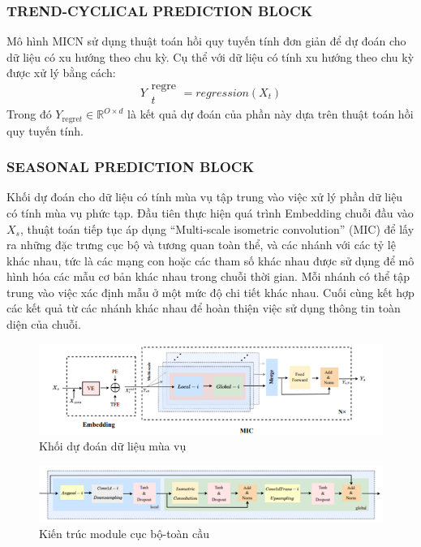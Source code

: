 \documentclass[conference]{IEEEtran}
\begin{document}
\subsubsection{TREND-CYCLICAL PREDICTION BLOCK}
Mô hình MICN sử dụng thuật toán hồi quy tuyến tính đơn giản để dự đoán cho dữ liệu có xu hướng theo chu kỳ. Cụ thể với dữ liệu có tính xu hướng theo chu kỳ được xử lý bằng cách:
\[Y{\substack{\text{regre}\\t}}{} = regression(X_t)\]
Trong đó \(Y_{\text{regre}t} \in \mathbb{R}^{O \times d}\) là kết quả dự đoán của phần này dựa trên thuật toán hồi quy tuyến tính.

\subsubsection{SEASONAL PREDICTION BLOCK}
Khối dự đoán cho dữ liệu có tính mùa vụ tập trung vào việc xử lý phần dữ liệu có tính mùa vụ phức tạp. Đầu tiên thực hiện quá trình Embedding chuỗi đầu vào $X_s$, thuật toán tiếp tục áp dụng “Multi-scale isometric convolution” (MIC) để lấy ra những đặc trưng cục bộ và tương quan toàn thể, và các nhánh với các tỷ lệ khác nhau, tức là các mạng con hoặc các tham số khác nhau được sử dụng để mô hình hóa các mẫu cơ bản khác nhau trong chuỗi thời gian. Mỗi nhánh có thể tập trung vào việc xác định mẫu ở một mức độ chi tiết khác nhau. Cuối cùng kết hợp các kết quả từ các nhánh khác nhau để hoàn thiện việc sử dụng thông tin toàn diện của chuỗi.
\begin{figure}[H]
    \centering
    \begin{minipage}{0.8\linewidth}
    \centering
        \includegraphics[width=\linewidth]{images/MICN_SeasonalBlock.png}
    \caption{Khối dự đoán dữ liệu mùa vụ}
    \label{fig11}
    \end{minipage}
\end{figure}
\begin{figure}[H]
    \centering
    \begin{minipage}{0.8\linewidth}
    \centering
        \includegraphics[width=\linewidth]{images/MICN_LocalGlobalModule.png}
    \caption{Kiến trúc module cục bộ-toàn cầu}
    \label{fig11}
    \end{minipage}
\end{figure}
\end{document}
